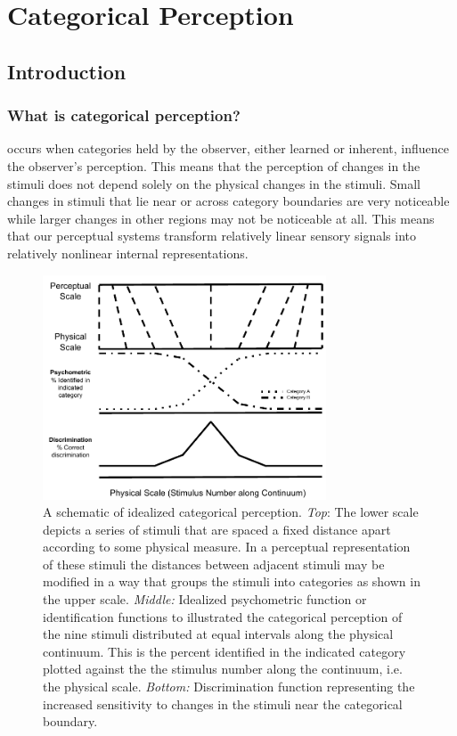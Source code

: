 \chapter{Categorical Perception}

\section{Introduction}
\subsection{What is categorical perception?}

\CP occurs when categories held by the observer, either learned or inherent, influence the observer’s perception. This means that the perception of changes in the stimuli does not depend solely on the physical changes in the stimuli. Small changes in stimuli that lie near or across category boundaries are very noticeable while larger changes in other regions may not be noticeable at all. This means that our perceptual systems transform relatively linear sensory signals into relatively nonlinear internal representations.

\begin{figure}[h] 
  \centering
  \includegraphics[width=0.75\textwidth]{figures/CP_def.pdf}
  \caption[A schematic of idealized categorical perception]
{A schematic of idealized categorical perception. \emph{Top}: The lower scale depicts a series of stimuli that are spaced a fixed distance apart according to some physical measure. In a perceptual representation of these stimuli the distances between adjacent stimuli may be modified in a way that groups the stimuli into categories as shown in the upper scale. \emph{Middle:} Idealized psychometric function or identification functions to illustrated the categorical perception of the nine stimuli distributed at equal intervals along the physical continuum. This is the percent identified in the indicated category plotted against the the stimulus number along the continuum, i.e. the physical scale. \emph{Bottom:} Discrimination function representing the increased sensitivity to changes in the stimuli near the categorical boundary.}
  \label{fig:cpdef}
\end{figure}


